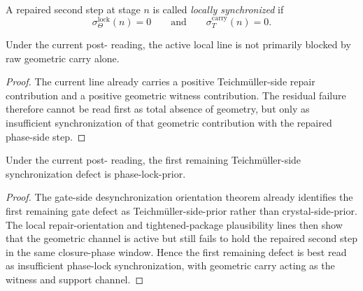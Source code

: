 \begin{definition}
\label{def:locally-synchronized-repaired-second-step}
A repaired second step at stage $n$ is called \emph{locally synchronized} if
\[
 \sigma_{\Theta}^{\mathrm{lock}}(n)=0
 \qquad\text{and}\qquad
 \sigma_T^{\mathrm{carry}}(n)=0.
\]
\end{definition}

\begin{proposition}
\label{prop:current-line-is-not-raw-geometry-prior}
Under the current post- reading, the active local line is not primarily blocked by raw geometric carry alone.
\end{proposition}

\begin{proof}
The current line already carries a positive Teichm\"uller-side repair contribution and a positive geometric witness contribution. The residual failure therefore cannot be read first as total absence of geometry, but only as insufficient synchronization of that geometric contribution with the repaired phase-side step.
\end{proof}

\begin{proposition}
\label{prop:current-line-is-phase-lock-prior-on-the-teichmueller-side}
Under the current post- reading, the first remaining Teichm\"uller-side synchronization defect is phase-lock-prior.
\end{proposition}

\begin{proof}
The gate-side desynchronization orientation theorem already identifies the first remaining gate defect as Teichm\"uller-side-prior rather than crystal-side-prior. The local repair-orientation and tightened-package plausibility lines then show that the geometric channel is active but still fails to hold the repaired second step in the same closure-phase window. Hence the first remaining defect is best read as insufficient phase-lock synchronization, with geometric carry acting as the witness and support channel.
\end{proof}


